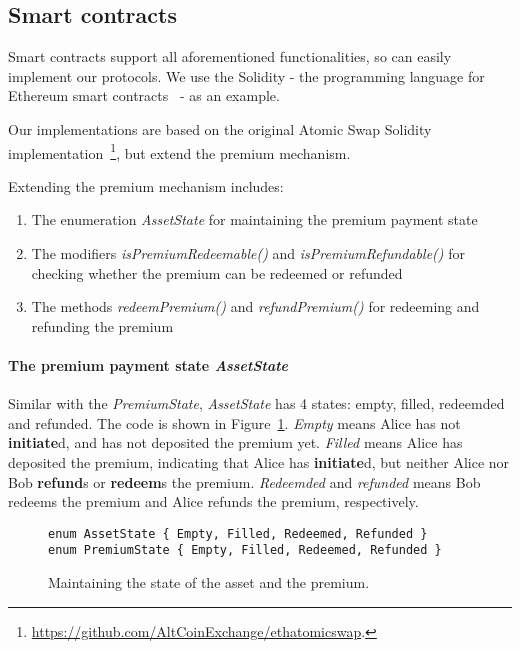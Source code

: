 \subsection{Smart contracts}

Smart contracts support all aforementioned functionalities, so can easily implement our protocols.
We use the Solidity - the programming language for Ethereum smart contracts~\cite{wood2014ethereum} - as an example.

Our implementations are based on the original Atomic Swap Solidity implementation~\footnote{\url{https://github.com/AltCoinExchange/ethatomicswap}.},
but extend the premium mechanism.

Extending the premium mechanism includes:

\begin{enumerate}
    \item The enumeration \textit{AssetState} for maintaining the premium payment state
    \item The modifiers \textit{isPremiumRedeemable()} and \textit{isPremiumRefundable()} for checking whether the premium can be redeemed or refunded
    \item The methods \textit{redeemPremium()} and \textit{refundPremium()} for redeeming and refunding the premium
\end{enumerate}

\paragraph{The premium payment state \textit{AssetState}}

Similar with the \textit{PremiumState}, \textit{AssetState} has 4 states: empty, filled, redeemded and refunded.
The code is shown in Figure~\ref{code:state}.
\textit{Empty} means Alice has not \textbf{initiate}d, and has not deposited the premium yet.
\textit{Filled} means Alice has deposited the premium, indicating that Alice has \textbf{initiate}d, but neither Alice nor Bob \textbf{refund}s or \textbf{redeem}s the premium.
\textit{Redeemded} and \textit{refunded} means Bob redeems the premium and Alice refunds the premium, respectively.

\begin{figure}
\begin{lstlisting}[language=Solidity, basicstyle=\tiny]
enum AssetState { Empty, Filled, Redeemed, Refunded }
enum PremiumState { Empty, Filled, Redeemed, Refunded }
\end{lstlisting}
\label{code:state}
\caption{Maintaining the state of the asset and the premium.}
\end{figure}

